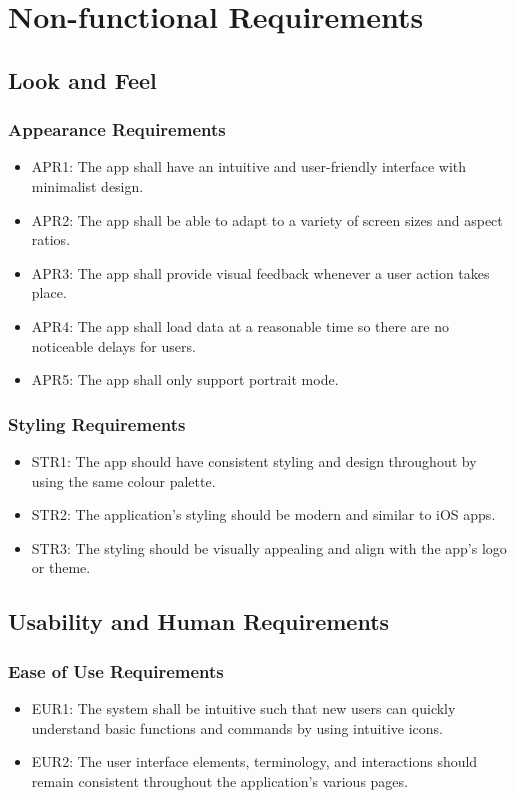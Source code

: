 \documentclass[12pt]{article}
\begin{document}
\section{Non-functional Requirements}

\subsection{Look and Feel}

\subsubsection{Appearance Requirements}
\begin{itemize}
\item APR1: The app shall have an intuitive and user-friendly interface with minimalist design.
\item APR2: The app shall be able to adapt to a variety of screen sizes and aspect ratios.
\item APR3: The app shall provide visual feedback whenever a user action takes place.
\item APR4: The app shall load data at a reasonable time so there are no noticeable delays for users.
\item APR5: The app shall only support portrait mode.
\end{itemize}

\subsubsection{Styling Requirements}
\begin{itemize}
\item STR1: The app should have consistent styling and design throughout by using the same colour palette.
\item STR2: The application’s styling should be modern and similar to iOS apps.
\item STR3: The styling should be visually appealing and align with the app’s logo or theme.
\end{itemize}

\subsection{Usability and Human Requirements}

\subsubsection{Ease of Use Requirements}
\begin{itemize}
\item EUR1: The system shall be intuitive such that new users can quickly understand basic functions and commands by using intuitive icons.
\item EUR2: The user interface elements, terminology, and interactions should remain consistent throughout the application’s various pages.
\end{itemize}
\end{document}
